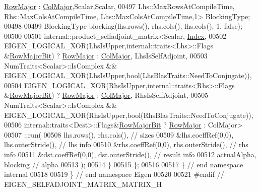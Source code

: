 \begin{DoxyCode}
      \hyperlink{group__enums_ggaacded1a18ae58b0f554751f6cdf9eb13acfcde9cd8677c5f7caf6bd603666aae3}{RowMajor} : \hyperlink{group__enums_ggaacded1a18ae58b0f554751f6cdf9eb13a0cbd4bdd0abcfc0224c5fcb5e4f6669a}{ColMajor},Scalar,Scalar,
00497               Lhs::MaxRowsAtCompileTime, Rhs::MaxColsAtCompileTime, Lhs::MaxColsAtCompileTime,1> 
      BlockingType;
00498 
00499     BlockingType blocking(lhs.rows(), rhs.cols(), lhs.cols(), 1, \textcolor{keyword}{false});
00500 
00501     internal::product\_selfadjoint\_matrix<Scalar, \hyperlink{namespace_eigen_a62e77e0933482dafde8fe197d9a2cfde}{Index},
00502       EIGEN\_LOGICAL\_XOR(LhsIsUpper,internal::traits<Lhs>::Flags &\hyperlink{group__flags_gae4f56c2a60bbe4bd2e44c5b19cbe8762}{RowMajorBit}) ? 
      \hyperlink{group__enums_ggaacded1a18ae58b0f554751f6cdf9eb13acfcde9cd8677c5f7caf6bd603666aae3}{RowMajor} : \hyperlink{group__enums_ggaacded1a18ae58b0f554751f6cdf9eb13a0cbd4bdd0abcfc0224c5fcb5e4f6669a}{ColMajor}, LhsIsSelfAdjoint,
00503       NumTraits<Scalar>::IsComplex && EIGEN\_LOGICAL\_XOR(LhsIsUpper,\textcolor{keywordtype}{bool}(LhsBlasTraits::NeedToConjugate)),
00504       EIGEN\_LOGICAL\_XOR(RhsIsUpper,internal::traits<Rhs>::Flags &\hyperlink{group__flags_gae4f56c2a60bbe4bd2e44c5b19cbe8762}{RowMajorBit}) ? 
      \hyperlink{group__enums_ggaacded1a18ae58b0f554751f6cdf9eb13acfcde9cd8677c5f7caf6bd603666aae3}{RowMajor} : \hyperlink{group__enums_ggaacded1a18ae58b0f554751f6cdf9eb13a0cbd4bdd0abcfc0224c5fcb5e4f6669a}{ColMajor}, RhsIsSelfAdjoint,
00505       NumTraits<Scalar>::IsComplex && EIGEN\_LOGICAL\_XOR(RhsIsUpper,\textcolor{keywordtype}{bool}(RhsBlasTraits::NeedToConjugate)),
00506       internal::traits<Dest>::Flags&\hyperlink{group__flags_gae4f56c2a60bbe4bd2e44c5b19cbe8762}{RowMajorBit}  ? \hyperlink{group__enums_ggaacded1a18ae58b0f554751f6cdf9eb13acfcde9cd8677c5f7caf6bd603666aae3}{RowMajor} : ColMajor>
00507       ::run(
00508         lhs.rows(), rhs.cols(),                 \textcolor{comment}{// sizes}
00509         &lhs.coeffRef(0,0), lhs.outerStride(),  \textcolor{comment}{// lhs info}
00510         &rhs.coeffRef(0,0), rhs.outerStride(),  \textcolor{comment}{// rhs info}
00511         &dst.coeffRef(0,0), dst.outerStride(),  \textcolor{comment}{// result info}
00512         actualAlpha, blocking                   \textcolor{comment}{// alpha}
00513       );
00514   \}
00515 \};
00516 
00517 \} \textcolor{comment}{// end namespace internal}
00518 
00519 \} \textcolor{comment}{// end namespace Eigen}
00520 
00521 \textcolor{preprocessor}{#endif // EIGEN\_SELFADJOINT\_MATRIX\_MATRIX\_H}
\end{DoxyCode}
